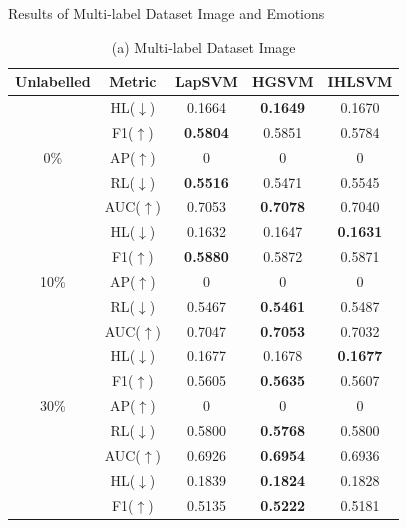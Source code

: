 \documentclass[12pt,a4paper,oneside,english]{report}
\begin{document}
\begin{table}[htbp]
    \caption{Results of Multi-label Dataset Image and Emotions}
    \tiny
    \begin{center}
        \begin{minipage}{0.48\linewidth}
            \centering
            \caption*{(a) Multi-label Dataset Image}
            \begin{tabular}{|c|c|c|c|c|}
                \hline
                \textbf{Unlabelled} & \textbf{Metric} & \textbf{LapSVM} & \textbf{HGSVM} & \textbf{IHLSVM} \\
                \hline
                & HL(\(\downarrow\)) & 0.1664 & \textbf{0.1649} & 0.1670 \\
                & F1(\(\uparrow\))   & \textbf{0.5804} & 0.5851 & 0.5784 \\
                0\% & AP(\(\uparrow\)) & 0 & 0 & 0 \\
                & RL(\(\downarrow\)) & \textbf{0.5516} & 0.5471 & 0.5545 \\
                & AUC(\(\uparrow\))  & 0.7053 & \textbf{0.7078} & 0.7040 \\
                \hline
                & HL(\(\downarrow\)) & 0.1632 & 0.1647 & \textbf{0.1631} \\
                & F1(\(\uparrow\))   & \textbf{0.5880} & 0.5872 & 0.5871 \\
                10\% & AP(\(\uparrow\)) & 0 & 0 & 0 \\
                & RL(\(\downarrow\)) & 0.5467 & \textbf{0.5461} & 0.5487 \\
                & AUC(\(\uparrow\))  & 0.7047 & \textbf{0.7053} & 0.7032 \\
                \hline
                & HL(\(\downarrow\)) & 0.1677 & 0.1678 & \textbf{0.1677} \\
                & F1(\(\uparrow\))   & 0.5605 & \textbf{0.5635} & 0.5607 \\
                30\% & AP(\(\uparrow\)) & 0 & 0 & 0 \\
                & RL(\(\downarrow\)) & 0.5800 & \textbf{0.5768} & 0.5800 \\
                & AUC(\(\uparrow\))  & 0.6926 & \textbf{0.6954} & 0.6936 \\
                \hline
                & HL(\(\downarrow\)) & 0.1839 & \textbf{0.1824} & 0.1828 \\
                & F1(\(\uparrow\))   & 0.5135 & \textbf{0.5222} & 0.5181 \\

\end{tabular}
\end{minipage}
\end{center}
\end{table}
\end{document}
